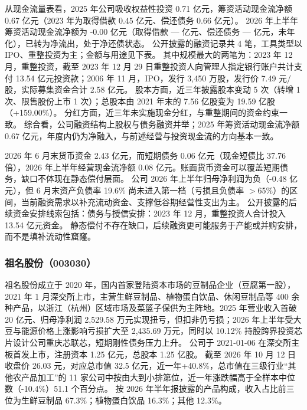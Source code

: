  从现金流量表看，2025 年公司吸收权益性投资 0.71 亿元，筹资活动现金流净额 0.67 亿元（2023 年为取得借款 0.45 亿元、偿还债务 0.66 亿元）。 2026 年上半年筹资活动现金流净额为 -0.00 亿元（取得借款 — 亿元、偿还债务 — 亿元，未年化），已转为净流出，处于净还债状态。 公开披露的融资记录共 4 笔，工具类型以 IPO、重整投资为主；金额与用途见下表。 其中规模最大的两笔为：2023 年 12 月，重整投资，截至 2023 年 12 月 29 日重整投资人向管理人指定银行账户共计支付 13.54 亿元投资款；2006 年 11 月，IPO，发行 3,450 万股，发行价 7.49 元/股，实际募集资金合计 2.58 亿元。 股本方面，近三年披露股本变动 5 次（转增 1 次、限售股份上市 1 次）；总股本由 2021 年末的 7.56 亿股变为 19.59 亿股（+159.00\%）。 分红方面，近三年未实施现金分红，与重整期间的资金约束一致。 综合看，公司融资结构上股权与债务融资并举；2025 年筹资活动现金流净额 0.67 亿元，年度内仍为净融入，与前述经营与投资现金流的方向基本一致。

 2026 年 6 月末货币资金 2.43 亿元，而短期债务 0.06 亿元（现金短债比 37.76 倍），2026 年上半年经营现金流净额 0.08 亿元。账面货币资金可以覆盖短期债务，缺口不体现在静态偿付层面。 公司 2026 年上半年归母净利润为负（-0.48 亿元），但 6 月末资产负债率 19.6\% 尚未进入第一档（亏损且负债率 $>$65\%）的区间，当前融资需求以补充流动资金、支撑低谷期经营性支出为主。 公开披露的后续资金安排线索包括：债务与授信安排：2023 年 12 月，重整投资人合计投入 13.54 亿元资金。 静态偿付不存在缺口，后续融资更可能服务于产能或并购安排，而不是填补流动性窟窿。




\subsubsection{祖名股份（003030）}
\label{co:003030}

 祖名股份成立于 2020 年，国内首家登陆资本市场的豆制品企业（豆腐第一股），2021 年 1 月深交所上市，主营生鲜豆制品、植物蛋白饮品、休闲豆制品等 400 余种产品，以浙江（杭州）区域市场及菜篮子保供为主阵地。2025 年营业收入首破 20 亿元、归母净利润 2,529.58 万元实现扭亏，但扣非仍亏损；2026 年上半年受大豆与能源价格上涨影响亏损扩大至 2,435.69 万元，同时以 10.12\% 持股跨界投资芯片设计公司重庆芯联芯，短期刚性债务压力上升。 公司于 2021-01-06 在深交所主板首发上市，注册资本 1.25 亿元，总股本 1.25 亿股。 截至 2026 年 10 月 12 日收盘价 26.03 元，对应总市值 32.5 亿元，近一年+40.8\%，总市值在三级行业“其他农产品加工”的 11 家公司中按由大到小排第位，近一年涨跌幅高于全样本中位数（-10.4\%）51.1 个百分点。 按 2026 年半年报披露的产品构成，收入占比前三位为生鲜豆制品 67.3\%；植物蛋白饮品 16.3\%；其他 12.3\%。

